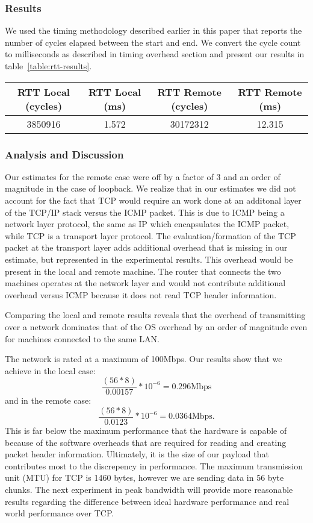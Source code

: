\subsubsection{Results}

We used the timing methodology described earlier in this paper that reports the
number of cycles elapsed between the start and end. We convert the cycle count
to milliseconds as described in timing overhead section and present our results
in table~\ref{table:rtt-results}.

\begin{table*}[b]
\begin{tabular}{|c|c|c|c|}
\hline
RTT Local (cycles) & RTT Local (ms) & RTT Remote (cycles) & RTT Remote (ms) \\ \hline
3850916            & 1.572          & 30172312            & 12.315          \\ \hline
\end{tabular}
\caption{RTT experimental results}
\label{table:rtt-results}
\end{table*}

\subsubsection{Analysis and Discussion}

Our estimates for the remote case were off by a factor of 3 and an order of
magnitude in the case of loopback. We realize that in our estimates we did not
account for the fact that TCP would require an work done at an additonal layer
of the TCP/IP stack versus the ICMP packet. This is due to ICMP being a network 
layer protocol, the same as IP which encapsulates the ICMP packet, while TCP is 
a transport layer protocol. The evaluation/formation of the TCP packet at the
transport layer adds additional overhead that is missing in our estimate, but 
represented in the experimental results. This overhead would be present in the 
local and remote machine. The router that connects the two machines operates 
at the network layer and would not contribute additional overhead versus ICMP 
because it does not read TCP header information.

Comparing the local and remote results reveals that the overhead of transmitting
over a network dominates that of the OS overhead by an order of magnitude 
even for machines connected to the same LAN.

The network is rated at a maximum of 100Mbps. Our results show that we achieve in 
the local case: $$\frac{(56*8)}{0.00157} * 10^{-6} = 0.296\text{Mbps}$$
and in the remote case: $$\frac{(56*8)}{0.0123} * 10^{-6} = 0.0364\text{Mbps}.$$
This is far below the maximum performance that the hardware is capable of because of
 the software overheads that are required for reading and creating packet header information.
Ultimately, it is the size of our payload that contributes most to the discrepency 
in performance. The maximum transmission unit (MTU) for TCP is 1460 bytes, 
however we are sending data in 56 byte chunks. The next experiment in peak bandwidth 
will provide more reasonable results regarding the difference between ideal 
hardware performance and real world performance over TCP.

